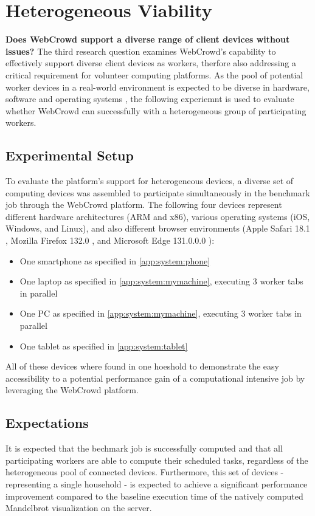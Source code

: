 \section{Heterogeneous Viability}
\label{sec:evaluation:heterogen}
\textbf{Does WebCrowd support a diverse range of client devices without issues?}
The third research question examines WebCrowd's capability to effectively support diverse client devices as workers, therfore also addressing a critical requirement for volunteer computing platforms. As the pool of potential worker devices in a real-world environment is expected to be diverse in hardware, software and operating systems \cite{intro:diverseDevices}, the following experiemnt is used to evaluate whether WebCrowd can successfully with a heterogeneous group of participating workers.

\subsection{Experimental Setup}
To evaluate the platform's support for heterogeneous devices, a diverse set of computing devices was assembled to participate simultaneously in the benchmark job through the WebCrowd platform. The following four devices represent different hardware architectures (ARM and x86), various operating systems (iOS, Windows, and Linux), and also different browser environments (Apple Safari 18.1 \cite{evaluation:safari}, Mozilla Firefox 132.0 \cite{background:firefox}, and Microsoft Edge 131.0.0.0 \cite{evaluation:edge}):
\begin{itemize}
    \item One smartphone as specified in \autoref{app:system:phone}
    \item One laptop as specified in \autoref{app:system:mymachine}, executing 3 worker tabs in parallel
    \item One \acs{PC} as specified in \autoref{app:system:mymachine}, executing 3 worker tabs in parallel
    \item One tablet as specified in \autoref{app:system:tablet}
\end{itemize}
All of these devices where found in one hoeshold to demonstrate the easy accessibility to a potential performance gain of a computational intensive job by leveraging the WebCrowd platform.

\subsection{Expectations}
It is expected that the bechmark job is successfully computed and that all participating workers are able to compute their scheduled tasks, regardless of the heterogeneous pool of connected devices. Furthermore, this set of devices - representing a single household - is expected to achieve a significant performance improvement compared to the baseline execution time of the natively computed Mandelbrot visualization on the server.  

